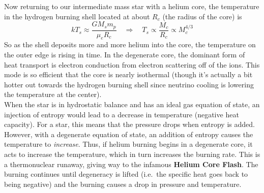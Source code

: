 \documentclass[10pt]{article}
\numberwithin{equation}{section}
\newcommand{\n}{\noindent}
\begin{document}
    \n Now returning to our intermediate mass star with a helium
    core, the temperature in the hydrogen burning shell located at
    about $R_c$ (the radius of the core) is
    \begin{equation}
      \label{eq:282}
      kT_s\approx\frac{G M_sm_p}{\mu_e R_c}\quad\Rightarrow \quad
      T_s\propto \frac{M_c}{R_c}\propto M_c^{4/3}
    \end{equation}
    So as the shell deposits more and more helium into the core, the
    temperature on the outer edge is rising in time. In the degenerate 
core,
    the dominant form of heat transport is electron conduction from
    electron scattering off of the ions. This mode is so efficient
    that the core is nearly isothermal (though it's actually a bit
    hotter out towards the hydrogen burning shell since neutrino
    cooling is lowering the temperature at the center).\\

    \n When the star is in hydrostatic balance and has an ideal gas equation of
    state, an injection of entropy would lead to a decrease in temperature
    (negative heat capacity). For a star, this means that the pressure drops
    when entropy is added. However, with a degenerate equation of state, an
    addition of entropy causes the temperature to \emph{increase}. Thus, if
    helium burning begins in a degenerate core, it acts to increase the
    temperature, which in turn increases the burning rate. This is a
    thermonuclear runaway, giving way to the infamous \textbf{Helium Core
    Flash}. The burning continues until degeneracy is lifted (i.e.\ the
    specific heat goes back to being negative) and the burning causes a drop in
    pressure and temperature.\\
\end{document}
